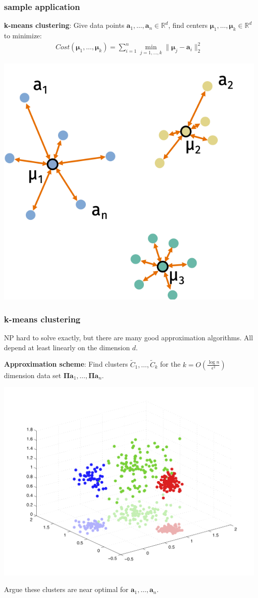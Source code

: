 \documentclass[compress,handout]{beamer}
\newcommand{\bs}[1]{\boldsymbol{#1}}
\newcommand{\bv}[1]{\mathbf{#1}}
\newcommand{\R}{\mathbb{R}}
\begin{document}
\begin{frame}[t]
	\frametitle{sample application}
	\textbf{k-means clustering}: Give data points $\bv{a}_1,\ldots, \bv{a}_n \in \R^d$, find centers $\bs{\mu}_1, \ldots, \bs{\mu}_k\in \R^d$ to minimize:
	\begin{align*}
		Cost(\bs{\mu}_1,\ldots, \bs{\mu}_k) = \sum_{i=1}^n \min_{j = 1,\ldots,k} \|\bs{\mu}_j - \bv{a}_i\|_2^2
	\end{align*}
	\begin{center}
		\includegraphics[width=.5\textwidth]{kmeans3.png}
	\end{center}
\end{frame}

\begin{frame}[t]
	\frametitle{k-means clustering}
	NP hard to solve exactly, but there are many good approximation algorithms. All depend at least linearly on the dimension $d$. 
	
	\textbf{Approximation scheme}: Find clusters $\tilde{C}_1, \ldots, \tilde{C}_k$ for the $k = O\left(\frac{\log n}{\epsilon^2}\right)$ dimension data set $\bs{\Pi}\bv{a}_1, \ldots, \bs{\Pi}\bv{a}_n.$
	
	\vspace{-3em}
	\begin{center}
		\includegraphics[width=.6\textwidth]{clustering_projected.png}
	\end{center}
	\vspace{-2em}
Argue these clusters are near optimal for $\bv{a}_1, \ldots, \bv{a}_n$.
\end{frame}
\end{document}
